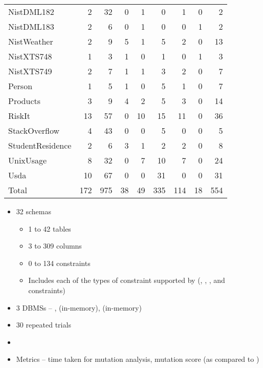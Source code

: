 \begin{table}[t!]
{\begin{tabular}{l@{\hskip -5pt}rrrrrrrr}
				NistDML182 & 2 & 32 & 0 & 1 & 0 & 1 & 0 & 2 \\
				NistDML183 & 2 & 6 & 0 & 1 & 0 & 0 & 1 & 2 \\
				NistWeather & 2 & 9 & 5 & 1 & 5 & 2 & 0 & 13 \\
				NistXTS748 & 1 & 3 & 1 & 0 & 1 & 0 & 1 & 3 \\
				NistXTS749 & 2 & 7 & 1 & 1 & 3 & 2 & 0 & 7 \\
				Person & 1 & 5 & 1 & 0 & 5 & 1 & 0 & 7 \\
				Products & 3 & 9 & 4 & 2 & 5 & 3 & 0 & 14 \\
				RiskIt & 13 & 57 & 0 & 10 & 15 & 11 & 0 & 36 \\
				StackOverflow & 4 & 43 & 0 & 0 & 5 & 0 & 0 & 5 \\
				StudentResidence & 2 & 6 & 3 & 1 & 2 & 2 & 0 & 8 \\
				UnixUsage & 8 & 32 & 0 & 7 & 10 & 7 & 0 & 24 \\
				Usda & 10 & 67 & 0 & 0 & 31 & 0 & 0 & 31 \\
				\hline
				{Total} & 172 & 975 & 38 & 49 & 335 & 114 & 18 & 554 \\
				\hline

			\end{tabular}
		}
	\end{table}

	\begin{itemize}
		\item 32 schemas
		\begin{itemize}
			\item 1 to 42 tables
			\item 3 to 309 columns
			\item 0 to 134 constraints
			\item Includes each of the types of constraint supported by \SchemaAnalyst (\PK, \FK, \NOTNULL, \UNIQUE and \CHECK constraints)
		\end{itemize}
		\item 3 DBMSs -- \Postgres, \HyperSQL (in-memory), \SQLite (in-memory)
		\item 30 repeated trials
		\item {} \\
		\item Metrics -- time taken for mutation analysis, mutation score (as compared to \Original)
	\end{itemize}


